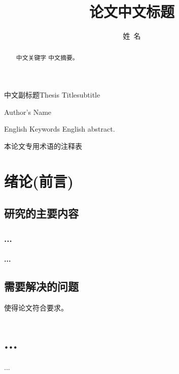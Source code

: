 \documentclass[unicode,bachelor]{seuthesis} %
\begin{document}
\title{论文中文标题}{中文副标题}{Thesis Title}{subtitle}
\author{姓~名}{Author's Name}
\address{河海院2楼}
\maketitle

\begin{abstract}{中文关键字}
  中文摘要。
\end{abstract}

\begin{englishabstract}{English Keywords}
  English abstract.
\end{englishabstract}

\begin{terminology}
  本论文专用术语的注释表
\end{terminology}

\begin{Main} %

\chapter{绪论(前言)}
\section{研究的主要内容}
\subsection{...}
\subsubsection{...}
\section{需要解决的问题}
使得论文符合要求\cite{seugs:standard}。

\chapter{...}
...

\end{Main} %
\end{document}
